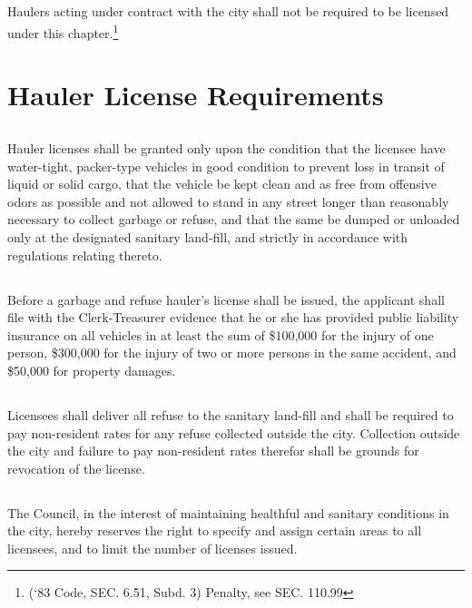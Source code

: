 \subsection{}
Haulers acting under contract with the city shall not be required to be licensed under this chapter.\footnote{(‘83 Code, SEC. 6.51, Subd. 3)  Penalty, see SEC. 110.99}

\section{Hauler License Requirements}
\subsection{}
Hauler licenses shall be granted only upon the condition that the licensee have water-tight, packer-type vehicles in good condition to prevent loss in transit of liquid or solid cargo, that the vehicle be kept clean and as free from offensive odors as possible and not allowed to stand in any street longer than reasonably necessary to collect garbage or refuse, and that the same be dumped or unloaded only at the designated sanitary land-fill, and strictly in accordance with regulations relating thereto.
\subsection{}
Before a garbage and refuse hauler’s license shall be issued, the applicant shall file with the Clerk-Treasurer evidence that he or she has provided public liability insurance on all vehicles in at least the sum of \$100,000 for the injury of one person, \$300,000 for the injury of two or more persons in the same accident, and \$50,000 for property damages.
\subsection{}
Licensees shall deliver all refuse to the sanitary land-fill and shall be required to pay non-resident rates for any refuse collected outside the city.  Collection outside the city and failure to pay non-resident rates therefor shall be grounds for revocation of the license.
\subsection{}
The Council, in the interest of maintaining healthful and sanitary conditions in the city, hereby reserves the right to specify and assign certain areas to all licensees, and to limit the number of licenses issued.

